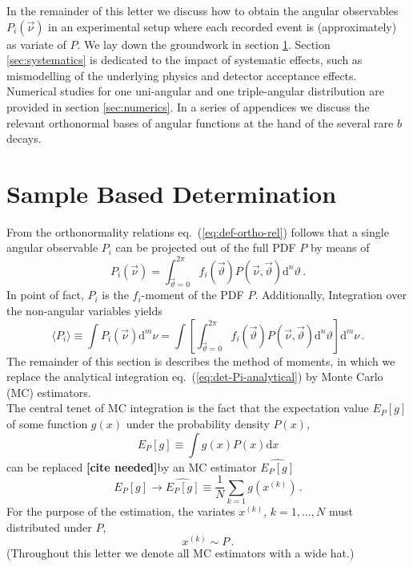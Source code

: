 \documentclass[aps,prd,reprint,nofootinbib,preprintnumbers]{revtex4}
\newcommand{\dd}{\text{d}}
\newcommand{\refeq}[1]{eq.~(\ref{eq:#1})}
\newcommand{\nuvec}{\vec{\nu}}
\newcommand{\thvec}{\vec{\vartheta}}
\renewcommand{\theta}{\vartheta}
\newcommand{\what}[1]{\widehat{#1}}
\newcommand{\citeneeded}{{\color{red}\bf [cite needed]}}
\begin{document}
In the remainder of this letter we discuss how to obtain the angular observables $P_i(\nuvec)$ in an experimental
setup where each recorded event is (approximately) as variate of $P$.
We lay down the groundwork in section \ref{sec:sample-based-det}. Section \ref{sec:systematics} is dedicated to
the impact of systematic effects, such as mismodelling of the underlying physics and detector acceptance
effects. Numerical studies for one uni-angular and one triple-angular distribution are provided in section
\ref{sec:numerics}. In a series of appendices we discuss the relevant orthonormal bases of angular functions
at the hand of the several rare $b$ decays.



\section{Sample Based Determination}
\label{sec:sample-based-det}

From the orthonormality relations \refeq{def-ortho-rel} follows that a single angular observable $P_i$
can be projected out of the full PDF $P$ by means of
\begin{equation}
    \label{eq:det-Pi-analytical}
    P_i(\nuvec) = \int_{\thvec = 0}^{2\pi} f_i(\thvec) P(\nuvec, \thvec) \dd^n \theta\,.
\end{equation}
In point of fact, $P_i$ is the $f_i$-moment of the PDF $P$. Additionally, Integration over the non-angular variables yields
\begin{equation}
    \langle P_i\rangle
    \equiv \int P_i(\nuvec) \dd^m \nu
    = \int \left[\int_{\thvec=0}^{2\pi} f_i(\thvec) P(\nuvec,\thvec) \dd^n\theta\right]\dd^m \nu\,.
\end{equation}
The remainder of this section is describes the method of moments, in which we replace the
analytical integration \refeq{det-Pi-analytical} by Monte Carlo (MC) estimators.\\


The central tenet of MC integration is the fact that the expectation value $E_P[g]$ of some function
$g(x)$ under the probability density $P(x)$,
\begin{equation}
    E_P[g] \equiv \int g(x) P(x) \dd x
\end{equation}
can be replaced \citeneeded by an MC estimator $\what{E_P[g]}$
\begin{equation}
    \label{eq:mc-id}
    E_P[g] \to \widehat{E_P[g]} \equiv \frac{1}{N} \sum_{k=1} g(x^{(k)})\,.
\end{equation}
For the purpose of the estimation, the variates $x^{(k)}$, $k = 1, \dots, N$ must distributed under $P$,
\begin{equation}
    x^{(k)} \sim P\,.
\end{equation}
(Throughout this letter we denote all MC estimators with a wide hat.)\\
\end{document}
